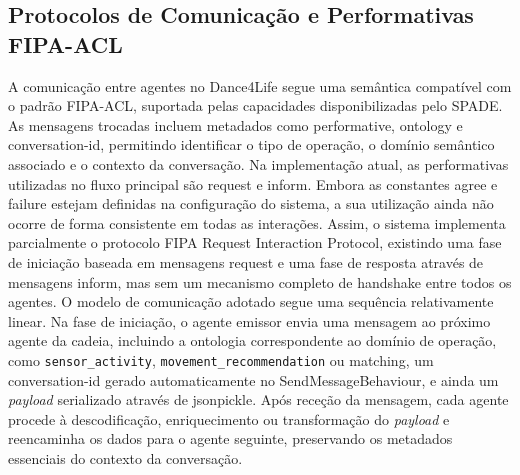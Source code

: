 \documentclass[runningheads]{llncs}
\begin{document}
\subsection{Protocolos de Comunicação e Performativas FIPA-ACL}
A comunicação entre agentes no Dance4Life segue uma semântica compatível com o padrão FIPA-ACL, suportada pelas capacidades disponibilizadas pelo SPADE. As mensagens trocadas incluem metadados como performative, ontology e conversation-id, permitindo identificar o tipo de operação, o domínio semântico associado e o contexto da conversação. 
Na implementação atual, as performativas utilizadas no fluxo principal são request e inform. Embora as constantes agree e failure estejam definidas na configuração do sistema, a sua utilização ainda não ocorre de forma consistente em todas as interações. Assim, o sistema implementa parcialmente o protocolo FIPA Request Interaction Protocol, existindo uma fase de iniciação baseada em mensagens request e uma fase de resposta através de mensagens inform, mas sem um mecanismo completo de handshake entre todos os agentes. 
O modelo de comunicação adotado segue uma sequência relativamente linear. Na fase de iniciação, o agente emissor envia uma mensagem ao próximo agente da cadeia, incluindo a ontologia correspondente ao domínio de operação, como \texttt{sensor\_activity}, \texttt{movement\_recommendation} ou matching, um conversation-id gerado automaticamente no SendMessageBehaviour, e ainda um \textit{payload} serializado através de jsonpickle. Após receção da mensagem, cada agente procede à descodificação, enriquecimento ou transformação do \textit{payload} e reencaminha os dados para o agente seguinte, preservando os metadados essenciais do contexto da conversação.  
 
\end{document}
